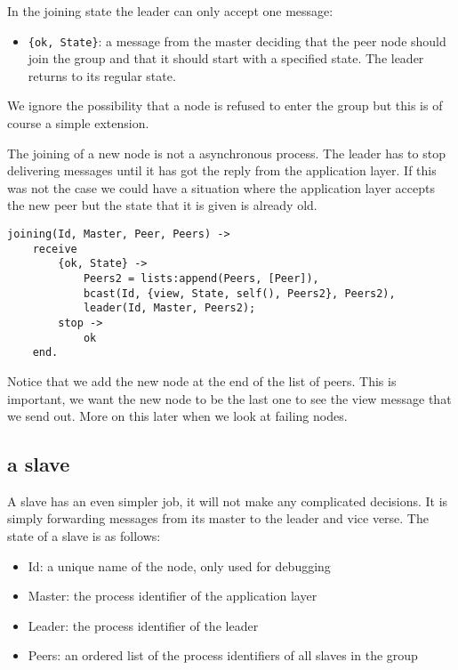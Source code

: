 \documentclass[a4paper,11pt]{article}
\begin{document}
In the joining state the leader can only accept one message:

\begin{itemize}
\item {\tt \{ok, State\}}: a message from the master deciding that the
  peer node should join the group and that it should start with a
  specified state. The leader returns to its regular state.
\end{itemize}

We ignore the possibility that a node is refused to enter the group
but this is of course a simple extension.

The joining of a new node is not a asynchronous process. The leader
has to stop delivering messages until it has got the reply from the
application layer. If this was not the case we could have a situation
where the application layer accepts the new peer but the state that it
is given is already old.


\begin{verbatim}
joining(Id, Master, Peer, Peers) ->
    receive 
        {ok, State} ->
            Peers2 = lists:append(Peers, [Peer]),           
            bcast(Id, {view, State, self(), Peers2}, Peers2),
            leader(Id, Master, Peers2);
        stop ->
            ok
    end.
\end{verbatim}

Notice that we add the new node at the end of the list of peers. This
is important, we want the new node to be the last one to see the view
message that we send out. More on this later when we look at failing nodes.

\subsection{a slave}

A slave has an even simpler job, it will not make any complicated
decisions. It is simply forwarding messages from its master to the
leader and vice verse. The state of a slave is as follows:

\begin{itemize}
\item Id: a unique name of the node, only used for debugging
\item Master: the process identifier of the application layer
\item Leader: the process identifier of the leader
\item Peers: an ordered list of the process identifiers of all slaves in the group
\end{itemize}
\end{document}

